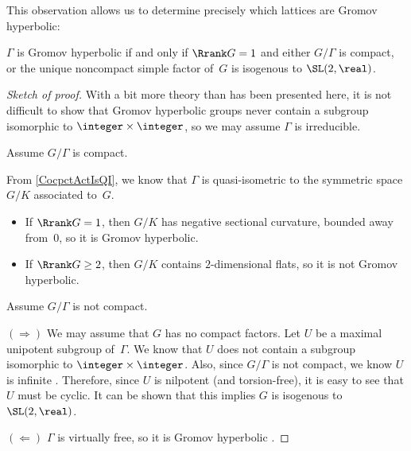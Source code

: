 This observation allows us to determine precisely which lattices are Gromov hyperbolic:

\begin{prop} \label{WhichLattsHyper}
 $\Gamma$ is Gromov hyperbolic if and only if\/
$\Rrank G = 1$ and either $G/\Gamma$ is
compact, or the unique noncompact simple factor of~$G$ is
isogenous to\/ $\SL(2,\real)$.
 \end{prop}

\begin{proof}[Sketch of proof]
With a bit more theory than has been presented here, it is not difficult to show that Gromov hyperbolic groups never contain a subgroup isomorphic to $\integer \times
\integer$, so we may assume $\Gamma$ is irreducible.

\setcounter{case}{0}

\begin{case}
Assume $G/\Gamma$ is compact.
 \end{case}
 From \cref{CocpctActIsQI}, we know that $\Gamma$ is quasi-isometric to the symmetric space $G/K$ associated to~$G$.
 	\begin{itemize}
	\item If $\Rrank G = 1$, then $G/K$ has negative sectional curvature, bounded away from~$0$, so it is Gromov hyperbolic. 
	\item If $\Rrank G \ge 2$, then $G/K$ contains $2$-dimensional
flats, so it is not Gromov hyperbolic.
	\end{itemize}

\begin{case}
Assume $G/\Gamma$ is not compact.
 \end{case}
 $(\Rightarrow)$ We may assume that $G$ has no compact factors. Let $U$ be a maximal unipotent subgroup of~$\Gamma$. We know that $U$ does not
contain a subgroup isomorphic to $\integer \times
\integer$. Also, since $G/\Gamma$ is not compact, we know $U$ is infinite . Therefore, since $U$ is nilpotent (and torsion-free), it is easy to see that $U$ must be cyclic. It can be shown that this implies $G$ is isogenous to
$\SL(2,\real)$.

$(\Leftarrow)$ $\Gamma$ is virtually free, so it is Gromov hyperbolic .
 \end{proof}


